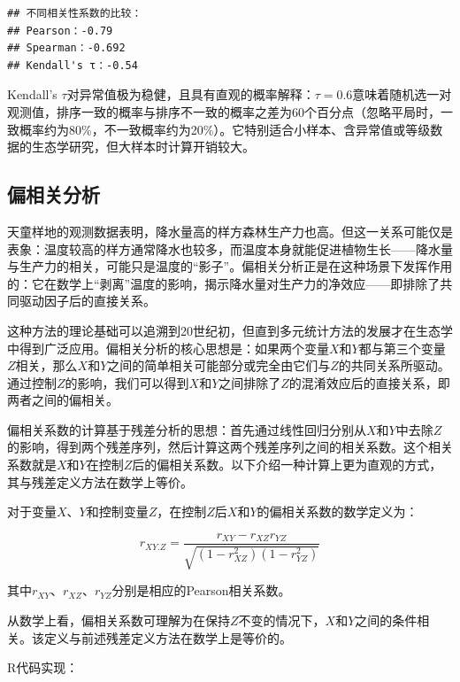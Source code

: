 \documentclass[
  twoside,12pt,fontset=none]{ctexbook}
\begin{document}
\begin{verbatim}
## 不同相关性系数的比较：
## Pearson：-0.79
## Spearman：-0.692
## Kendall's τ：-0.54
\end{verbatim}

Kendall's \(\tau\)对异常值极为稳健，且具有直观的概率解释：\(\tau=0.6\)意味着随机选一对观测值，排序一致的概率与排序不一致的概率之差为60个百分点（忽略平局时，一致概率约为80\%，不一致概率约为20\%）。它特别适合小样本、含异常值或等级数据的生态学研究，但大样本时计算开销较大。

\hypertarget{ux504fux76f8ux5173ux5206ux6790}{%
\subsection{偏相关分析}\label{ux504fux76f8ux5173ux5206ux6790}}

天童样地的观测数据表明，降水量高的样方森林生产力也高。但这一关系可能仅是表象：温度较高的样方通常降水也较多，而温度本身就能促进植物生长------降水量与生产力的相关，可能只是温度的``影子''。偏相关分析正是在这种场景下发挥作用的：它在数学上``剥离''温度的影响，揭示降水量对生产力的净效应------即排除了共同驱动因子后的直接关系。

这种方法的理论基础可以追溯到20世纪初，但直到多元统计方法的发展才在生态学中得到广泛应用。偏相关分析的核心思想是：如果两个变量\(X\)和\(Y\)都与第三个变量\(Z\)相关，那么\(X\)和\(Y\)之间的简单相关可能部分或完全由它们与\(Z\)的共同关系所驱动。通过控制\(Z\)的影响，我们可以得到\(X\)和\(Y\)之间排除了\(Z\)的混淆效应后的直接关系，即两者之间的偏相关。

偏相关系数的计算基于残差分析的思想：首先通过线性回归分别从\(X\)和\(Y\)中去除\(Z\)的影响，得到两个残差序列，然后计算这两个残差序列之间的相关系数。这个相关系数就是\(X\)和\(Y\)在控制\(Z\)后的偏相关系数。以下介绍一种计算上更为直观的方式，其与残差定义方法在数学上等价。

对于变量\(X\)、\(Y\)和控制变量\(Z\)，在控制\(Z\)后\(X\)和\(Y\)的偏相关系数的数学定义为：

\[r_{XY.Z} = \frac{r_{XY} - r_{XZ}r_{YZ}}{\sqrt{(1-r_{XZ}^2)(1-r_{YZ}^2)}}\]

其中\(r_{XY}\)、\(r_{XZ}\)、\(r_{YZ}\)分别是相应的Pearson相关系数。

从数学上看，偏相关系数可理解为在保持\(Z\)不变的情况下，\(X\)和\(Y\)之间的条件相关。该定义与前述残差定义方法在数学上是等价的。

R代码实现：
\end{document}
